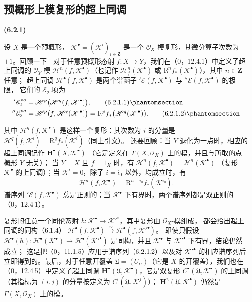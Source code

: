 \documentclass[UTF8,fontset=none,11pt,oneside,openany]{ctexbook}
\newenvironment{env}[1][]{%
  \par\medskip\noindent\textbf{(#1)}\ %
}{\par}
\newcommand{\oldpage}[2][]{%
  \hypertarget{ega-source-page-#1-#2}{}%
  \marginnote{\scriptsize\textbf{#1}~|~#2}\ignorespaces}
\let\EGAOriginalLabel\label
\renewcommand{\label}[1]{\phantomsection\EGAOriginalLabel{#1}}
\begin{document}
\subsection{预概形上模复形的超上同调}
\label{subsection:III.6.2.fr}

\begin{env}[6.2.1]
设 $X$ 是一个预概形，
$\mathscr K^\bullet=(\mathscr K^i)_{i\in\mathbf Z}$ 是一个
$\mathscr O_X$-模复形，其微分算子次数为 $+1$。回顾一下：对于任意预概形态射
$f:X\to Y$，我们在（0，12.4.1）中定义了超上同调的
$\mathscr O_Y$-模
$\mathscr H^n(f,\mathscr K^\bullet)$（也记作
$\mathscr H_f^n(\mathscr K^\bullet)$ 或
$\mathrm R^n f_*(\mathscr K^\bullet)$），其中 $n\in\mathbf Z$ 任意；
超上同调 $\mathscr H^\bullet(f,\mathscr K^\bullet)$ 是两个谱函子
$'\mathscr E(f,\mathscr K^\bullet)$ 与 $''\mathscr E(f,\mathscr K^\bullet)$ 的极限，
它们的 $\mathscr E_2$ 项为
\begin{align}
  '\mathscr E_2^{pq}
    &=\mathscr H^p\bigl(\mathscr H^q(f,\mathscr K^\bullet)\bigr),
    \tag{6.2.1.1}\label{III.6.2.1.1-fr}\\
  ''\mathscr E_2^{pq}
    &=\mathscr H^p\bigl(f,\mathscr H^q(\mathscr K^\bullet)\bigr)
      =\mathrm R^p f_*\bigl(\mathscr H^q(\mathscr K^\bullet)\bigr).
    \tag{6.2.1.2}\label{III.6.2.1.2-fr}
\end{align}

\oldpage[III]{139}

其中 $\mathscr H^q(f,\mathscr K^\bullet)$ 是这样一个复形：其次数为
$i$ 的分量是
$\mathscr H^q(f,\mathscr K^i)=\mathrm R^q f_*(\mathscr K^i)$（同上引文）。
还要回顾：当 $Y$ 退化为一点时，相应的超上同调记作
$\mathbf H^\bullet(X,\mathscr K^\bullet)$
（它是定义在 $\Gamma(X,\mathscr O_X)$ 上的模，并且与所取的点概形 $Y$ 无关）；
当 $Y=X$ 且 $f=1_X$ 时，有
$\mathscr H^n(f,\mathscr K^\bullet)=\mathscr H^n(\mathscr K^\bullet)$
（复形 $\mathscr K^\bullet$ 的上同调）；当 $\mathscr K^i=0$，除了 $i=i_0$ 以外，均成立时，有
\[
  \mathscr H^n(f,\mathscr K^\bullet)
    =\mathrm R^{n-i_0}f_*(\mathscr K^{i_0}).
\]
谱序列 $'\mathscr E(f,\mathscr K^\bullet)$ 总是正则的；当
$\mathscr K^\bullet$ 下有界时，两个谱序列都是双正则的（0，12.4.1）。

复形的任意一个同伦态射
$h:\mathscr K^\bullet\to\mathscr K'^\bullet$，其中复形由 $\mathscr O_X$-模组成，
都会给出超上同调的同构（6.1.4）
$\mathscr H^\bullet(f,\mathscr K^\bullet)\xrightarrow{\sim}
\mathscr H^\bullet(f,\mathscr K'^\bullet)$。
即使只假设
$\mathscr H^\bullet(h):\mathscr H^\bullet(\mathscr K^\bullet)\to
\mathscr H^\bullet(\mathscr K'^\bullet)$ 是同构，并且
$\mathscr K^\bullet$ 与 $\mathscr K'^\bullet$ 下有界，结论仍然成立；
这是把（0，11.1.5）应用于谱序列（6.2.1.2）以及对
$\mathscr K'^\bullet$ 的相应谱序列后立即得到的。最后，对于任意开覆盖
$\mathfrak U=(U_\alpha)$（它是 $X$ 的开覆盖），我们也在（0，12.4.5）中定义了超上同调
$\mathbf H^\bullet(\mathfrak U,\mathscr K^\bullet)$，它是双复形
$C^\bullet(\mathfrak U,\mathscr K^\bullet)$ 的上同调（其指标为 $(i,j)$ 的分量按定义为
$C^i(\mathfrak U,\mathscr K^j)$）；
$\mathbf H^n(\mathfrak U,\mathscr K^\bullet)$ 仍然是
$\Gamma(X,\mathscr O_X)$ 上的模。
\end{env}
\end{document}

